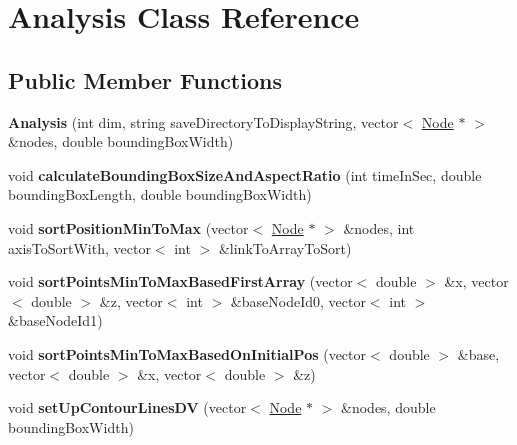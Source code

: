 \hypertarget{classAnalysis}{}\section{Analysis Class Reference}
\label{classAnalysis}
\subsection*{Public Member Functions}
\begin{DoxyCompactItemize}
\item 
\hypertarget{classAnalysis_a1dc55a8c5a1e73e75a326d1d58fb6ea6}{}{\bfseries Analysis} (int dim, string save\+Directory\+To\+Display\+String, vector$<$ \hyperlink{classNode}{Node} $\ast$ $>$ \&nodes, double bounding\+Box\+Width)\label{classAnalysis_a1dc55a8c5a1e73e75a326d1d58fb6ea6}

\item 
\hypertarget{classAnalysis_a05228992c22ff9888567ff7a4fd24e62}{}void {\bfseries calculate\+Bounding\+Box\+Size\+And\+Aspect\+Ratio} (int time\+In\+Sec, double bounding\+Box\+Length, double bounding\+Box\+Width)\label{classAnalysis_a05228992c22ff9888567ff7a4fd24e62}

\item 
\hypertarget{classAnalysis_a3100b3db6005134b3676f508185afc4f}{}void {\bfseries sort\+Position\+Min\+To\+Max} (vector$<$ \hyperlink{classNode}{Node} $\ast$ $>$ \&nodes, int axis\+To\+Sort\+With, vector$<$ int $>$ \&link\+To\+Array\+To\+Sort)\label{classAnalysis_a3100b3db6005134b3676f508185afc4f}

\item 
\hypertarget{classAnalysis_ae7f65777ed5b23c36efe37e8d516f65b}{}void {\bfseries sort\+Points\+Min\+To\+Max\+Based\+First\+Array} (vector$<$ double $>$ \&x, vector$<$ double $>$ \&z, vector$<$ int $>$ \&base\+Node\+Id0, vector$<$ int $>$ \&base\+Node\+Id1)\label{classAnalysis_ae7f65777ed5b23c36efe37e8d516f65b}

\item 
\hypertarget{classAnalysis_ac5d5556168335c54b4835ab3eece0ac8}{}void {\bfseries sort\+Points\+Min\+To\+Max\+Based\+On\+Initial\+Pos} (vector$<$ double $>$ \&base, vector$<$ double $>$ \&x, vector$<$ double $>$ \&z)\label{classAnalysis_ac5d5556168335c54b4835ab3eece0ac8}

\item 
\hypertarget{classAnalysis_a38f3e64e1080064bce5f67306073e24e}{}void {\bfseries set\+Up\+Contour\+Lines\+D\+V} (vector$<$ \hyperlink{classNode}{Node} $\ast$ $>$ \&nodes, double bounding\+Box\+Width)\label{classAnalysis_a38f3e64e1080064bce5f67306073e24e}


\end{DoxyCompactItemize}
